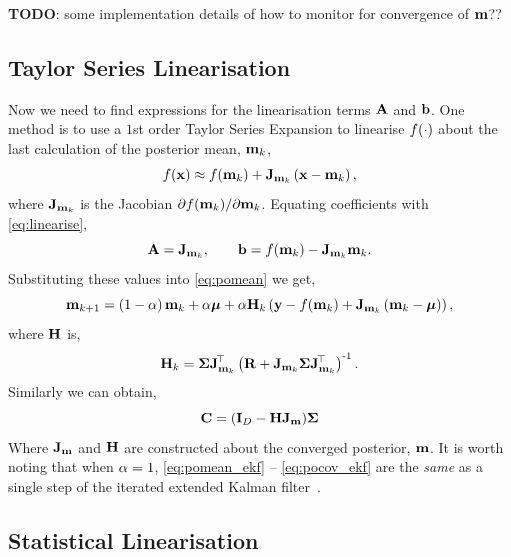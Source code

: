 \documentclass{article} %
\begin{document}
\textbf{TODO}: some implementation details of how to monitor for convergence of
$\mathbf{m}$??


\subsection{Taylor Series Linearisation}

Now we need to find expressions for the linearisation terms $\mathbf{A}$ and
$\mathbf{b}$. One method is to use a $1$st order Taylor Series Expansion to 
linearise $f\!\left({{\cdot}}\right)$ about the last calculation of the posterior mean, 
$\mathbf{m}_k$,
\begin{equation}
    f\!\left({{\mathbf{x}}}\right) \approx f\!\left({{\mathbf{m}_k}}\right) +
    \mathbf{J}_{\mathbf{m}_k}\left({\mathbf{x} - \mathbf{m}_k}\right),
\end{equation}
where $\mathbf{J}_{\mathbf{m}_k}$ is the Jacobian $\partial f\!\left({{\mathbf{m}_k}}\right)\!/ 
\partial\mathbf{m}_k$. Equating coefficients with \eqref{eq:linearise},
\begin{equation}
    \mathbf{A} = \mathbf{J}_{\mathbf{m}_k}, \qquad \mathbf{b} = f\!\left({{\mathbf{m}_k}}\right) -
    \mathbf{J}_{\mathbf{m}_k}\mathbf{m}_k.
\end{equation}
Substituting these values into \eqref{eq:pomean} we get,
\begin{equation}
    \mathbf{m}_{k+1} = \left({1-\alpha}\right)\mathbf{m}_k + \alpha\boldsymbol{\mu} 
        + \alpha\mathbf{H}_k\left({\mathbf{y} - f\!\left({{\mathbf{m}_k}}\right) 
        + \mathbf{J}_{\mathbf{m}_k}\left({\mathbf{m}_k - \boldsymbol{\mu}}\right)}\right),
    \label{eq:pomean_ekf}
\end{equation}
where $\mathbf{H}$ is,
\begin{equation}
    \mathbf{H}_k = \boldsymbol{\Sigma}\mathbf{J}_{\mathbf{m}_k}^{\!\top}\left({\mathbf{R} +
        \mathbf{J}_{\mathbf{m}_k}\boldsymbol{\Sigma}\mathbf{J}_{\mathbf{m}_k}^{\!\top}}\right)^{\text{-}1}.
\end{equation}
Similarly we can obtain,
\begin{equation}
    \mathbf{C} = \left({\mathbf{I}_{D} - \mathbf{H}\mathbf{J}_{\mathbf{m}}}\right)\!\boldsymbol{\Sigma}
    \label{eq:pocov_ekf}
\end{equation}
Where $\mathbf{J}_{\mathbf{m}}$ and $\mathbf{H}$ are constructed about the converged
posterior, $\mathbf{m}$. It is worth noting that when $\alpha = 1$,
\eqref{eq:pomean_ekf} -- \eqref{eq:pocov_ekf} are the \emph{same} as a single
step of the iterated extended Kalman filter~\cite{Bell1993, Sibley2006}.


\subsection{Statistical Linearisation}
\end{document}
